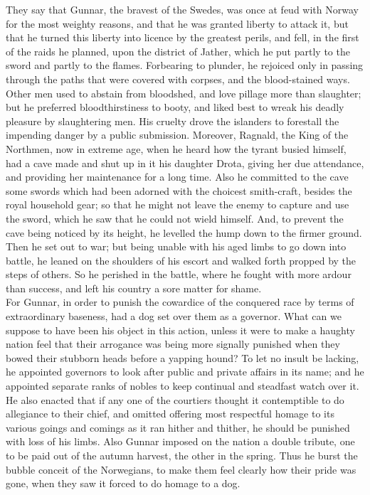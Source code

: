 \documentclass[10pt,a4paper]{report}
\begin{document}
They say that Gunnar, the bravest of the Swedes, was once at feud with Norway for the most weighty reasons, and that he was granted liberty to attack it, but that he turned this liberty into licence by the greatest perils, and fell, in the first of the raids he planned, upon the district of Jather, which he put partly to the sword and partly to the flames. Forbearing to plunder, he rejoiced only in passing through the paths that were covered with corpses, and the blood-stained ways. Other men used to abstain from bloodshed, and love pillage more than slaughter; but he preferred bloodthirstiness to booty, and liked best to wreak his deadly pleasure by slaughtering men. His cruelty drove the islanders to forestall the impending danger by a public submission. Moreover, Ragnald, the King of the Northmen, now in extreme age, when he heard how the tyrant busied himself, had a cave made and shut up in it his daughter Drota, giving her due attendance, and providing her maintenance for a long time. Also he committed to the cave some swords which had been adorned with the choicest smith-craft, besides the royal household gear; so that he might not leave the enemy to capture and use the sword, which he saw that he could not wield himself. And, to prevent the cave being noticed by its height, he levelled the hump down to the firmer ground. Then he set out to war; but being unable with his aged limbs to go down into battle, he leaned on the shoulders of his escort and walked forth propped by the steps of others. So he perished in the battle, where he fought with more ardour than success, and left his country a sore matter for shame.\\

For Gunnar, in order to punish the cowardice of the conquered race by terms of extraordinary baseness, had a dog set over them as a governor. What can we suppose to have been his object in this action, unless it were to make a haughty nation feel that their arrogance was being more signally punished when they bowed their stubborn heads before a yapping hound? To let no insult be lacking, he appointed governors to look after public and private affairs in its name; and he appointed separate ranks of nobles to keep continual and steadfast watch over it. He also enacted that if any one of the courtiers thought it contemptible to do allegiance to their chief, and omitted offering most respectful homage to its various goings and comings as it ran hither and thither, he should be punished with loss of his limbs. Also Gunnar imposed on the nation a double tribute, one to be paid out of the autumn harvest, the other in the spring. Thus he burst the bubble conceit of the Norwegians, to make them feel clearly how their pride was gone, when they saw it forced to do homage to a dog.\\
\end{document}
